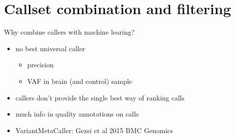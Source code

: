 \documentclass{beamer}
\begin{document}
\section{Callset combination and filtering}

\begin{frame}{Why combine callers with machine learing?}
\begin{itemize}
\item no best universal caller
\begin{itemize}
\item precision
\item VAF in brain (and control) sample
\end{itemize}
\item callers don't provide the single best way of ranking calls
\item much info in quality annotations on calls
\item VariantMetaCaller: Gezsi et al 2015 BMC Genomics 
\end{itemize}
\end{frame}
\end{document}
